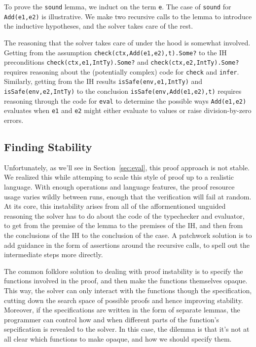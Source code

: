 \documentclass[sigplan,review,screen,anonymous]{acmart}
\begin{document}
To prove the \texttt{sound} lemma, we induct on the term \texttt{e}.
The case of \texttt{sound} for \texttt{Add(e1,e2)} is illustrative.
We make two recursive calls to the lemma to introduce the inductive hypotheses,
and the solver takes care of the rest. 

The reasoning that the solver takes care of under the hood is somewhat involved.
Getting from the assumption \texttt{check(ctx,Add(e1,e2),t).Some?} to
the IH preconditions \texttt{check(ctx,e1,IntTy).Some?} and
\texttt{check(ctx,e2,IntTy).Some?} requires reasoning about the (potentially complex) code for
\texttt{check} and \texttt{infer}. Similarly, getting from the IH results \texttt{isSafe(env,e1,IntTy)} and
\texttt{isSafe(env,e2,IntTy)} to the conclusion
\texttt{isSafe(env,Add(e1,e2),t)} requires reasoning through the code for \texttt{eval} to determine the possible
ways \texttt{Add(e1,e2)} evaluates when \texttt{e1} and \texttt{e2} might either evaluate to values or
raise division-by-zero errors.

\subsection*{Finding Stability}
Unfortunately, as we'll see in Section~\ref{sec:eval}, this proof approach is
not stable. We realized this while attemping to scale this style
of proof up to a realistic language. With enough operations and language
features, the proof resource usage varies wildly between runs,
enough that the verification will fail at random. At its core, this
instability arises from all of the afformentioned unguided reasoning the solver has to do about the
code of the typechecker and evaluator,
to get from the premise of the lemma to the premises of the IH, and then
from the conclusions of the IH to the conclusion of the case.
A patchwork solution is to add guidance in the form of assertions around the
recursive calls, to spell out the intermediate steps more directly.

The common folklore solution to dealing with proof instability is to specify the
functions involved in the proof, and then make the functions themselves opaque.
This way, the solver can only interact with the functions though the
specification, cutting down the search space of possible proofs and hence
improving stability.  Moreover, if the specifications are written in the form of
separate lemmas, the programmer can control how and when different parts of the
function's sepcification is revealed to the solver. In this case, the dilemma is
that it's not at all clear which functions to make opaque, and how we should
specify them.
\end{document}
